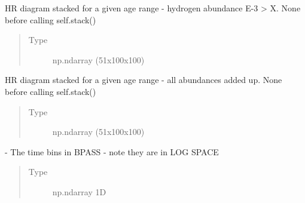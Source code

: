 \documentclass[letterpaper,10pt,english]{sphinxmanual}
\begin{document}
\begin{fulllineitems}
\begin{fulllineitems}
\begin{quote}
\begin{description}
\end{description}\end{quote}

\end{fulllineitems}


\begin{fulllineitems}
\label{\detokenize{hrdiagrams:hoki.hrdiagrams.HRDiagram.self.low_H_stacked}}
HR diagram stacked for a given age range - hydrogen abundance E-3 \textgreater{} X. None before calling
self.stack()
\begin{quote}\begin{description}
\item[{Type}] \leavevmode
np.ndarray (51x100x100)

\end{description}\end{quote}

\end{fulllineitems}


\begin{fulllineitems}
\label{\detokenize{hrdiagrams:hoki.hrdiagrams.HRDiagram.self.all_stacked}}
HR diagram stacked for a given age range - all abundances added up. None before calling
self.stack()
\begin{quote}\begin{description}
\item[{Type}] \leavevmode
np.ndarray (51x100x100)

\end{description}\end{quote}

\end{fulllineitems}


\begin{fulllineitems}
\label{\detokenize{hrdiagrams:hoki.hrdiagrams.HRDiagram.self.t}}
 - The time bins in BPASS - note they are in LOG SPACE
\begin{quote}\begin{description}
\item[{Type}] \leavevmode
np.ndarray 1D


\end{description}
\end{quote}
\end{fulllineitems}
\end{fulllineitems}
\end{document}
